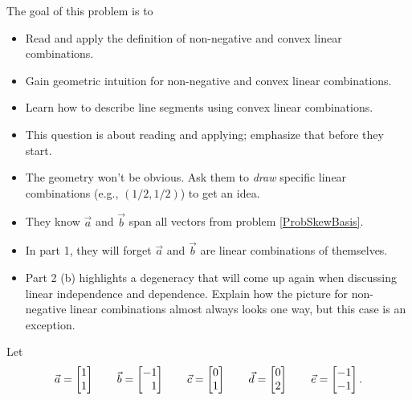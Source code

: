 	\displayonlynewpage

	\question
	\begin{annotation}
		\begin{goals}

			The goal of this problem is to
			\begin{itemize}
				\item Read and apply the definition of non-negative and convex
					linear combinations.
				\item Gain geometric intuition for non-negative and convex linear
					combinations.
				\item Learn how to describe line segments using
					convex linear combinations.
			\end{itemize}
		\end{goals}

		\begin{notes}
			\begin{itemize}
				\item This question is about reading and applying;
					emphasize that before they start.
				\item The geometry won't be obvious. Ask them to \emph{draw} specific
					linear combinations (e.g., $(1/2,1/2)$) to get an idea.
				\item They know $\vec a$ and $\vec b$ span all vectors from problem \ref{ProbSkewBasis}.
				\item In part 1, they will forget $\vec a$ and $\vec b$ are linear combinations of themselves.
				\item Part 2 (b) highlights a degeneracy that will come up again when discussing linear independence
					and dependence. Explain how the picture for non-negative linear combinations
					almost always looks one way, but this case is an exception.
			\end{itemize}
		\end{notes}
	\end{annotation}
	Let
	\[
		\vec a=\mat{1\\1} \qquad \vec b=\mat{-1\\1}\qquad \vec c=\mat{0\\1}\qquad\vec d=\mat{0\\2}\qquad\vec e=\mat{-1\\-1}.
	\]
